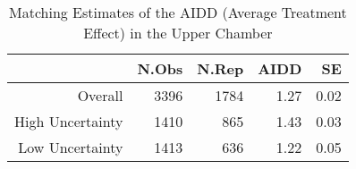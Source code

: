 \begin{table}[ht]
\centering
\begin{tabular}{rrrrr}
  \hline
 & N.Obs & N.Rep & AIDD & SE \\ 
  \hline
Overall & 3396 & 1784 & 1.27 & 0.02 \\ 
  High Uncertainty & 1410 & 865 & 1.43 & 0.03 \\ 
  Low Uncertainty & 1413 & 636 & 1.22 & 0.05 \\ 
   \hline
\end{tabular}
\caption{Matching Estimates of the AIDD (Average Treatment Effect) in the Upper Chamber} 
\label{matching.unc.ests}
\end{table}
